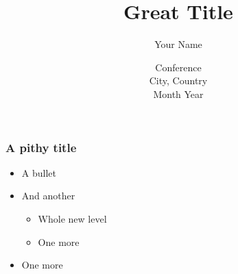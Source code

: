 \documentclass{beamer}
\title{Great Title}
\date{Conference \\ City, Country \\  Month Year}
\author{Your Name}
\begin{document}
\begin{frame}
\titlepage
\end{frame}


\begin{frame}
\frametitle{A pithy title}

\begin{itemize}
\item<1-> A bullet
\item<2-> And another
\begin{itemize}
	\item Whole new level
	\item One more
\end{itemize}
\item<3-> One more
\end{itemize}

\end{frame}
\end{document}
